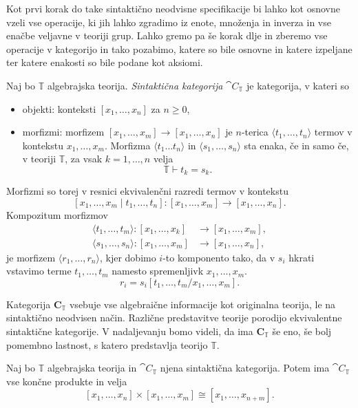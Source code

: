 \documentclass[../kategoricna_logika.tex]{subfiles}
\begin{document}
Kot prvi korak do take sintaktično neodvisne specifikacije
bi lahko kot osnovne vzeli vse operacije, ki jih lahko zgradimo iz
enote, množenja in inverza in vse
enačbe veljavne v teoriji grup. Lahko gremo pa še korak dlje
in zberemo vse operacije v kategorijo in tako pozabimo, katere so bile
osnovne in katere izpeljane ter katere enakosti so bile podane kot aksiomi.
%
\begin{definicija}
  Naj bo $\mathbb{T}$ algebrajska teorija.
  \emph{Sintaktična kategorija} $\cat{C}_\mathbb{T}$ je kategorija,
  v kateri so
  \begin{itemize}
  \item objekti: konteksti $[x_1, \ldots, x_n]$ za $n \geq 0$,
%
  \item morfizmi: morfizem $[x_1, \ldots, x_m] \to [x_1, \ldots, x_n]$
    je $n$-terica $\langle t_1, \ldots, t_n \rangle$ termov v kontekstu
    $x_1, \ldots, x_m$. Morfizma $\langle t_1 \ldots t_n \rangle$ in
    $\langle s_1, \ldots, s_n \rangle$ sta enaka, če in samo če,
    v teoriji $\mathbb{T}$, za vsak $k = 1, \ldots, n$ velja
    $$\mathbb{T} \vdash t_k = s_k.$$
\end{itemize}
%
Morfizmi so torej v resnici ekvivalenčni razredi termov v kontekstu
$$[x_1, \ldots, x_m \mid t_1, \ldots, t_n] : [x_1, \ldots, x_m] \to [x_1, \ldots, x_n].$$
%
Kompozitum morfizmov
  \begin{align*}
    \langle t_1, \ldots, t_m \rangle : [x_1, \ldots, x_k] &\to [x_1, \ldots, x_m], \\
    \langle s_1, \ldots, s_n \rangle : [x_1, \ldots, x_m] &\to [x_1, \ldots, x_n],
  \end{align*}
je morfizem $\langle r_1, \ldots, r_n \rangle$, kjer dobimo $i$-to komponento tako,
da v $s_i$ hkrati vstavimo terme $t_1, \ldots, t_m$ namesto
spremenljivk $x_1, \ldots, x_m$.
$$r_i = s_i[t_1, \ldots, t_m / x_1, \ldots, x_m].$$
%
\end{definicija}
Kategorija $\mathbf{C}_{\mathbb{T}}$ vsebuje vse algebraične
informacije kot originalna teorija, le na sintaktično neodvisen način.
Različne predstavitve teorije porodijo ekvivalentne sintaktične
kategorije. V nadaljevanju bomo videli, da ima $\mathbf{C}_{\mathbb{T}}$ še eno,
še bolj pomembno lastnost, s katero predstavlja teorijo $\mathbb{T}$.
%
\begin{lema}
  Naj bo $\mathbb{T}$ algebrajska teorija in $\cat{C}_\mathbb{T}$
  njena sintaktična kategorija. Potem ima $\cat{C}_\mathbb{T}$ vse
  končne produkte in velja
$$[x_1, \ldots, x_n] \times [x_1, \ldots, x_m] \cong [x_1, \ldots, x_{n+m}].$$
\end{lema}
\end{document}
